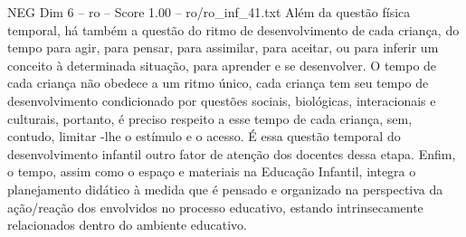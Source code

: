 \begin{textsample}{NEG Dim 6 – ro – Score 1.00 – ro/ro\_inf\_41.txt}
Além da questão física temporal, há também a questão do ritmo de desenvolvimento de cada criança, do tempo para agir, para pensar, para assimilar, para aceitar, ou para inferir um conceito à determinada situação, para aprender e se desenvolver.
O tempo de cada criança não obedece a um ritmo único, cada criança tem seu tempo de desenvolvimento condicionado por questões sociais, biológicas, interacionais e culturais, portanto, é preciso respeito a esse tempo de cada criança, sem, contudo, limitar -lhe o estímulo e o acesso.
É essa questão temporal do desenvolvimento infantil outro fator de atenção dos docentes dessa etapa.
Enfim, o tempo, assim como o espaço e materiais na Educação Infantil, integra o planejamento didático à medida que é pensado e organizado na perspectiva da ação/reação dos envolvidos no processo educativo, estando intrinsecamente relacionados dentro do ambiente educativo.

\end{textsample}
